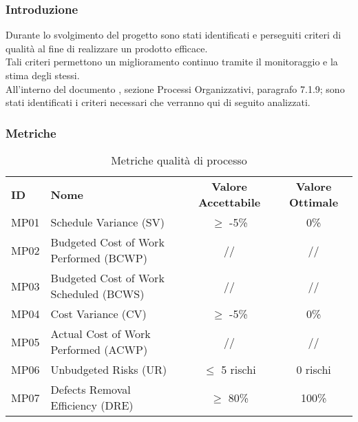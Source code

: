 

\subsubsection{Introduzione}
Durante lo svolgimento del progetto sono stati identificati e perseguiti criteri di qualità al fine di realizzare un prodotto efficace. \\
Tali criteri permettono un miglioramento continuo tramite il monitoraggio e la stima degli stessi.\\
All'interno del documento , sezione Processi Organizzativi, paragrafo 7.1.9; sono stati identificati i criteri necessari che verranno qui di seguito analizzati.
\subsubsection{Metriche}

\begin{table} [h!]
	\begin{center}
		\begin{tabular} {m{2 cm} m{7 cm} c c }
			\rowcolor{lightgray}
			\textbf{ID} & \textbf{Nome}& \textbf{Valore Accettabile} & \textbf{Valore Ottimale}\\
			MP01 & Schedule Variance (SV)   & $\geq$ -5\%    & 0\% \\
			MP02 & Budgeted Cost of Work Performed (BCWP) & //           & // \\
			MP03 & Budgeted Cost of Work Scheduled (BCWS) & //           & // \\
			MP04 & Cost Variance (CV)   & $\geq$ -5\% & 0\% \\
			MP05 & Actual Cost of Work Performed (ACWP) & //           & // \\
			MP06 & Unbudgeted Risks (UR)   & $\leq$ 5 rischi & 0 rischi\\
			MP07 & Defects Removal Efficiency (DRE)  & $\geq$  80\% & 100\%\\

		\end{tabular}
	\caption{Metriche qualità di processo}
	\end{center}
\end{table}





